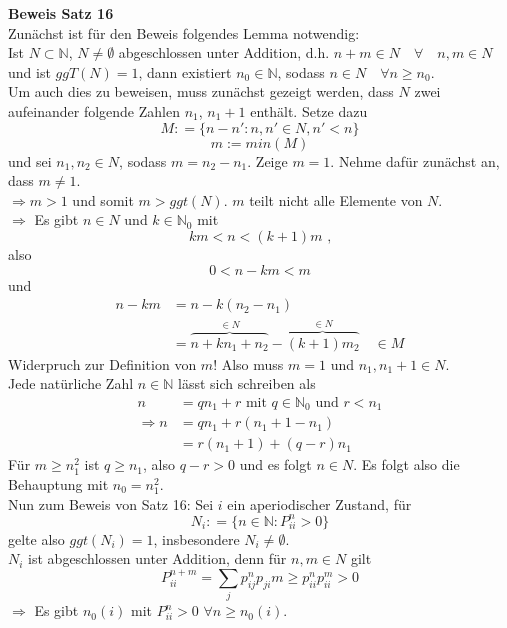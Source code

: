 \documentclass[a4paper,12pt]{article}
\begin{document}
\textbf{Beweis Satz 16}\\
Zunächst ist für den Beweis folgendes Lemma notwendig:\\
Ist $N \subset \mathbb{N}$, $N \neq \emptyset$ abgeschlossen unter Addition,
d.h. $n+m \in N \quad \forall \quad n,m \in N$ und ist $ggT(N)=1$, dann existiert
$n_0 \in \mathbb{N}$, sodass $n \in N \quad \forall n \geq n_0$.\\
Um auch dies zu beweisen, muss zunächst gezeigt werden, dass $N$ zwei aufeinander folgende Zahlen $n_1$, $n_{1}+1$ enthält. Setze dazu
$$
	M: = \{n- n': n,n' \in N, n'<n\}
$$
$$
	m:= min(M)
$$
und sei $n_1, n_2 \in N$, sodass $m = n_2 - n_1$. Zeige $m=1$. Nehme dafür zunächst an, dass $m \neq 1$.\\
$\Rightarrow m > 1$ und somit $m > ggt(N)$. $m$ teilt nicht alle Elemente von $N$.\\
$\Rightarrow$ Es gibt $n \in N$ und $k \in \mathbb{N}_0$ mit
$$km < n < (k+1)m \text{ ,}$$
also
$$0 < n-km < m$$
und
\begin{align*}
	n - km & = n-k(n_2 - n_1)                                                              \\
	       & = \overbrace{n+kn_1 + n_2}^{\in N} - \overbrace{(k+1)m_2}^{\in N} \quad \in M
\end{align*}
Widerpruch zur Definition von $m$! Also muss $m=1$ und $n_1, n_1 + 1 \in N$.\\
Jede natürliche Zahl $n \in \mathbb{N}$ lässt sich schreiben als
\begin{align*}
	n             & = qn_1 + r \text{ mit } q \in \mathbb{N}_0 \text{ und } r < n_1 \\
	\Rightarrow n & = q n_1 + r(n_1 + 1 - n_1)                                      \\
	              & = r(n_1 + 1) + (q-r)n_1
\end{align*}
Für $m \geq n_1^2$ ist $q \geq n_1$, also $q-r>0 $ und es folgt $n \in N$.
Es folgt also die Behauptung mit $n_0 = n_1^2$.\\

Nun zum Beweis von Satz 16:
Sei $i$ ein aperiodischer Zustand, für
$$
	N_i: = \{n \in \mathbb{N}: P_{ii}^n > 0\}
$$
gelte also $ggt(N_i) = 1$, insbesondere $N_i \neq \emptyset$.\\
$N_i $ ist abgeschlossen unter Addition, denn für $n,m \in N$ gilt
$$
	P_{ii}^{n+m} = \sum_{j}p_{ij}^np_{ji}m \geq p_{ii}^np_{ii}^m > 0
$$
$\Rightarrow$ Es gibt $n_0(i)$ mit $P_{ii}^n>0$ $\forall n \geq n_0(i)$.\\
\end{document}
